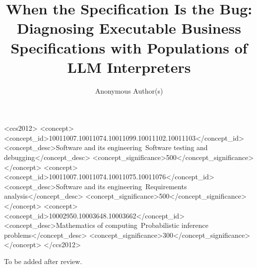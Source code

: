 \documentclass[acmsmall,screen,review,anonymous]{acmart}
\begin{document}
\title[When the Specification Is the Bug]{When the Specification Is the Bug: Diagnosing Executable Business Specifications with Populations of LLM Interpreters}

\author{Anonymous Author(s)}

\begin{abstract}

\end{abstract}

\begin{CCSXML}
<ccs2012>
<concept>
<concept_id>10011007.10011074.10011099.10011102.10011103</concept_id>
<concept_desc>Software and its engineering~Software testing and debugging</concept_desc>
<concept_significance>500</concept_significance>
</concept>
<concept>
<concept_id>10011007.10011074.10011075.10011076</concept_id>
<concept_desc>Software and its engineering~Requirements analysis</concept_desc>
<concept_significance>500</concept_significance>
</concept>
<concept>
<concept_id>10002950.10003648.10003662</concept_id>
<concept_desc>Mathematics of computing~Probabilistic inference problems</concept_desc>
<concept_significance>300</concept_significance>
</concept>
</ccs2012>
\end{CCSXML}


\maketitle













\begin{acks}
To be added after review.
\end{acks}




\appendix

\end{document}
